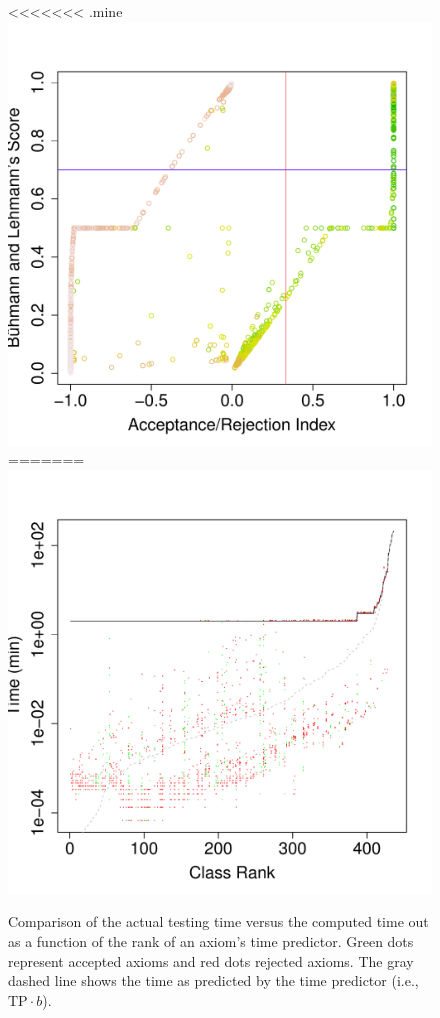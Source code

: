 \documentclass{sig-alternate}
\begin{document}
\begin{figure}[t]
\begin{center}
<<<<<<< .mine
\includegraphics[height=\plotheight]{ARI-BLS-dtc}
=======
  \includegraphics[height=\plotheight]{pred-and-actual-time}
\end{center}
\caption{Comparison of the actual testing time versus the computed time out
  as a function of the rank of an axiom's time predictor. Green dots represent
  accepted axioms and red dots rejected axioms. The gray dashed line shows the
  time as predicted by the time predictor (i.e., $\mathrm{TP}\cdot b$).}
\label{fig:pred-and-actual-time}
\end{figure}
\end{document}
